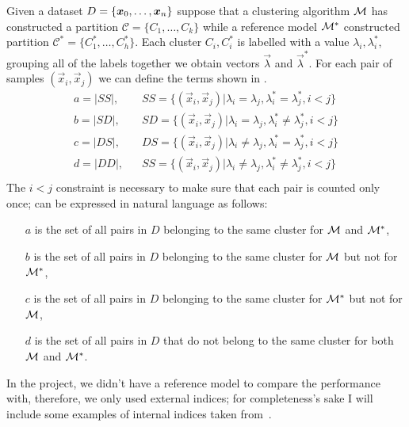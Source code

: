 Given a dataset $D = \{\boldsymbol{x}_0, \allowbreak\ldots\allowbreak, \boldsymbol{x}_n\}$ suppose that a clustering algorithm $\mathcal{M}$ has constructed a partition
$\mathcal{C} = \{C_1, \ldots, C_k\}$ while a reference model $\mathcal{M}^*$ constructed partition
$\mathcal{C}^*=\{C^*_1, \ldots, C^*_h\}$. Each cluster $C_i, C^*_i$ is labelled with a value
$\lambda_i, \lambda^*_i$, grouping all of the labels together we obtain vectors $\vec{\lambda}$ and
$\vec{\lambda}^*$. For each pair of samples $(\vec{x}_i, \vec{x}_j)$ we can define the terms shown in
.
\begin{equation}
	\label{eq:clustering-terms}
	\begin{aligned}
		a =|SS|, \hspace{10pt} &SS = \{(\vec{x}_i, \vec{x}_j) | \lambda_i = \lambda_j, \lambda^*_i =
		\lambda^*_j, i < j\} \\
		b =|SD|, \hspace{10pt} &SD = \{(\vec{x}_i, \vec{x}_j) | \lambda_i = \lambda_j, \lambda^*_i
		\neq \lambda^*_j, i < j\} \\
		c =|DS|, \hspace{10pt} &DS = \{(\vec{x}_i, \vec{x}_j) | \lambda_i \neq \lambda_j, \lambda^*_i =
		\lambda^*_j, i < j\} \\
		d =|DD|, \hspace{10pt} &SS = \{(\vec{x}_i, \vec{x}_j) | \lambda_i \neq \lambda_j,
		\lambda^*_i \neq \lambda^*_j, i < j\} \\
	\end{aligned}
\end{equation}
The $i < j$ constraint is necessary to make sure that each pair is counted only once;  can be expressed in natural language as follows:
\begin{itemize}
	\item[$a$] is the set of all pairs in $D$ belonging to the same cluster for $\mathcal{M}$ and
		$\mathcal{M}^*$,
	\item[$b$] is the set of all pairs in $D$ belonging to the same cluster for $\mathcal{M}$ but not
		for $\mathcal{M}^*$,
	\item[$c$] is the set of all pairs in $D$ belonging to the same cluster for $\mathcal{M}^*$ but
		not for $\mathcal{M}$,
	\item[$d$] is the set of all pairs in $D$ that do not belong to the same cluster for both
		$\mathcal{M}$ and $\mathcal{M}^*$.
\end{itemize}
In the project, we didn't have a reference model to compare the performance with, therefore, we only
used external indices; for completeness's sake I will include some examples of internal indices taken from~\cite{ZhouZhi-Hua2021ML}.

